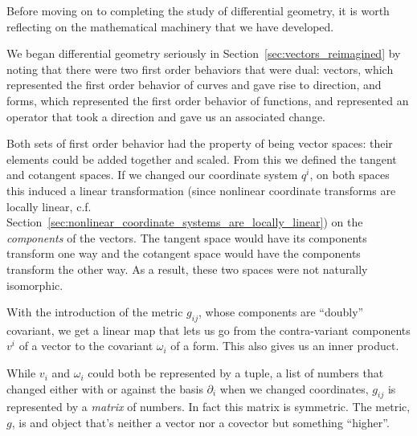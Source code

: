	
	Before moving on to completing the study of differential geometry, it is worth reflecting on the mathematical machinery that we have developed. 
	
	We began differential geometry seriously in Section~\ref{sec:vectors_reimagined} by noting that there were two first order behaviors that were dual: vectors, which represented the first order behavior of curves and gave rise to direction, and forms, which represented the first order behavior of functions, and represented an operator that took a direction and gave us an associated change.
	
	Both sets of first order behavior had the property of being vector spaces: their elements could be added together and scaled. From this we defined the tangent and cotangent spaces. If we changed our coordinate system $q^i$, on both spaces this induced a linear transformation (since nonlinear coordinate transforms are locally linear, c.f. Section~\ref{sec:nonlinear_coordinate_systems_are_locally_linear}) on the  \emph{components} of the vectors. The tangent space would have its components transform one way and the cotangent space would have the components transform the other way. As a result, these two spaces were not naturally isomorphic.
	
	With the introduction of the metric $g_{ij}$, whose components are ``doubly'' covariant, we get a linear map that lets us go from the contra-variant components $v^i$ of a vector to the covariant $\omega_i$ of a form. This also gives us an inner product. 
	
	While $v_i$ and $\omega_i$ could both be represented by a tuple, a list of numbers that changed either with or against the basis $\partial_i$ when we changed coordinates, $g_{ij}$ is represented by a \emph{matrix} of numbers. In fact this matrix is symmetric. The metric, $g$, is and object that's neither a vector nor a covector but something ``higher''.
	
